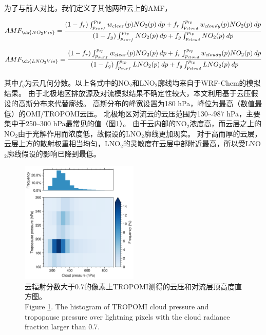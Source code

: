 为了与前人对比，我们定义了其他两种云上的AMF，

\begin{equation} \label{eq:AMF_NO2Vis}
AMF_{\ch{NO_2Vis}} = \frac{(1-f_r) \int_{p_{surf}}^{p_{tp}} w_{clear}(p) NO_2(p) \: dp + f_r \int_{p_{cloud}}^{p_{tp}} w_{cloudy}(p) NO_2(p) \: dp}{(1-f_g) \int_{p_{surf}}^{p_{tp}} NO_2(p) \: dp + f_g \int_{p_{cloud}}^{p_{tp}} NO_2(p) \: dp}
\end{equation}

\begin{equation} \label{eq:AMF_LNO2Vis}
AMF_{\ch{LNO_2Vis}} = \frac{(1-f_r) \int_{p_{surf}}^{p_{tp}} w_{clear}(p) NO_2(p) \: dp + f_r \int_{p_{cloud}}^{p_{tp}} w_{cloudy}(p) NO_2(p) \: dp}{(1-f_g) \int_{p_{surf}}^{p_{tp}} LNO_2(p) \: dp + f_g \int_{p_{cloud}}^{p_{tp}} LNO_2(p) \: dp}
\end{equation}

其中$f_g$为云几何分数。以上各式中的NO$_2$和LNO$_2$廓线均来自于WRF-Chem的模拟结果。
由于北极地区排放源及对流模拟结果不确定性较大，本文利用基于云压假设的高斯分布来代替廓线。
高斯分布的峰宽设置为180 hPa，峰位为最高（数值最低）的OMI/TROPOMI云压。
北极地区对流云的云压范围为130$\sim$987 hPa，主要集中于250--300 hPa最常见的值（图\ref{fig:pcld_ptropo}）。
由于云内部的NO$_2$浓度高，而云层之上的NO$_2$由于光解作用而浓度低，故假设的LNO$_2$廓线更加现实\citep{Beirle.2009}。
对于高而厚的云层，云层上方的散射权重相当均匀，LNO$_2$的灵敏度在云层中部附近最高，所以受LNO$_2$廓线假设的影响已降到最低\citep{Laughner.2017}。

\begin{figure}[!htbp]
\centering
\includegraphics[width=0.5\textwidth]{./figures/pcld_ptropo.png}
\caption{云辐射分数大于0.7的像素上TROPOMI测得的云压和对流层顶高度直方图。\\
Figure \ref{fig:pcld_ptropo}. The histogram of TROPOMI cloud pressure and tropopause pressure over lightning
pixels with the cloud radiance fraction larger than 0.7.
}
\label{fig:pcld_ptropo}
\end{figure}

